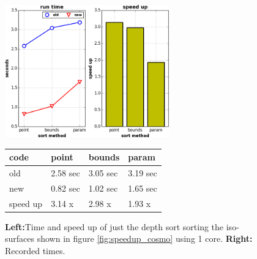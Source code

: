 \documentclass[a4paper,10pt]{report}
\begin{document}
\begin{figure}
\begin{minipage}{0.5\textwidth}
\includegraphics[height=2.25in]{./depth_sort_speedup.png}
\end{minipage}
\begin{minipage}{0.4\textwidth}
{\footnotesize
\def\arraystretch{1.25}
\begin{tabular}{|l|l|l|l|} \hline
{\bf code} & {\bf point} & {\bf bounds} & {\bf param} \\ \hline
old & 2.58 sec & 3.05 sec & 3.19 sec \\ \hline
new & 0.82 sec & 1.02 sec & 1.65 sec \\ \hline 
speed up & 3.14 x & 2.98 x & 1.93 x \\ \hline
\end{tabular}}
\end{minipage}
\caption{{\bf Left:}Time and speed up of just the depth sort sorting the iso-surfaces shown in figure \ref{fig:speedup_cosmo} using 1 core. {\bf Right:} Recorded times. }
\label{fig:blah}
\end{figure}
\end{document}

